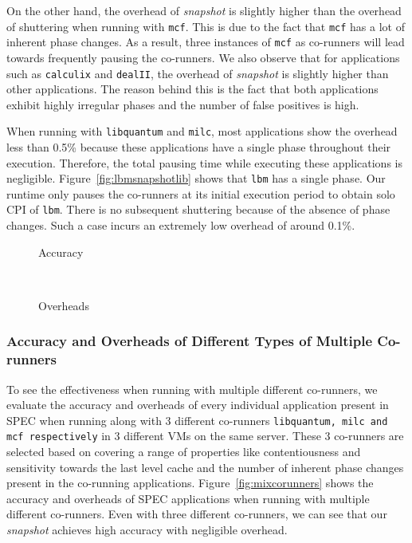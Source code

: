 \documentclass{sig-alternate}
\begin{document}
On the other hand, the overhead of \textit{snapshot} is slightly higher than the overhead of shuttering when running with \texttt{mcf}. This is due to the fact that \texttt{mcf} has a lot of inherent phase changes. As a result, three instances of \texttt{mcf} as co-runners will lead towards frequently pausing the co-runners. We also observe that for applications such as \texttt{calculix} and \texttt{dealII}, the overhead of \textit{snapshot} is slightly higher than other applications. The reason behind this is the fact that both applications exhibit highly irregular phases and the number of false positives is high.

When running with \texttt{libquantum} and \texttt{milc}, most applications show the overhead less than 0.5\% because these applications have a single phase throughout their execution. Therefore, the total pausing time while executing these applications is negligible.  Figure~\ref{fig:lbmsnapshotlib} shows that \texttt{lbm} has a single phase. Our runtime only pauses the co-runners at its initial execution period to obtain solo CPI of \texttt{lbm}. There is no subsequent shuttering because of the absence of phase changes. Such a case incurs an extremely low overhead of around 0.1\%.
\begin{figure*}
\centering
\begin{subfigure}[t]{2\columnwidth}
\centering
{}
\caption{Accuracy}
\label{fig:accuracymix}
\end{subfigure}
\hfill\\
\begin{subfigure}[t]{2\columnwidth}
\centering
{}
\caption{Overheads}
\label{fig:overheadmix}
\end{subfigure}
\caption{Accuracy and overheads of snapshot when running with co-runners libquantum, mcf and milc}
\label{fig:mixcorunners}
\end{figure*}
\subsubsection{Accuracy and Overheads of Different Types of Multiple Co-runners}
\label{subsubsec:AccuracyandOverheadsofDifferentTypesofMultipleCo-runners}

To see the effectiveness when running with multiple different co-runners, we evaluate the accuracy and overheads of every individual application present in SPEC when running along with 3 different co-runners \texttt{libquantum, milc and mcf respectively} in 3 different VMs on the same server. These 3 co-runners are selected based on covering a range of properties like contentiousness and sensitivity towards the last level cache and the number of inherent phase changes present in the co-running applications. Figure~\ref{fig:mixcorunners} shows the accuracy and overheads of SPEC applications when running with multiple different co-runners. Even with three different co-runners, we can see that our \textit{snapshot} achieves high accuracy with negligible overhead.
\end{document}

